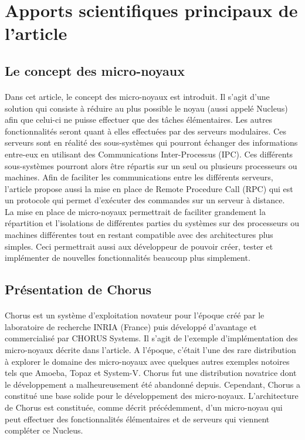 \documentclass[a4paper, 12pt]{article}
\begin{document}
\clearpage 
\section{Apports scientifiques principaux de l’article}
\subsection{Le concept des micro-noyaux}
\paragraph{}

Dans cet article, le concept des micro-noyaux est introduit. Il s'agit d'une solution qui consiste à réduire au plus possible le noyau (aussi appelé Nucleus) afin que celui-ci ne puisse effectuer que des tâches élémentaires. Les autres fonctionnalités seront quant à elles effectuées par des serveurs modulaires. Ces serveurs sont en réalité des sous-systèmes qui pourront échanger des informations entre-eux en utilisant des Communications Inter-Processus (IPC). Ces différents sous-systèmes pourront alors être répartis sur un seul ou plusieurs processeurs ou machines. Afin de faciliter les communications entre les différents serveurs, l'article propose aussi la mise en place de Remote Procedure Call (RPC) qui est un protocole qui permet d'exécuter des commandes sur un serveur à distance. \\
La mise en place de micro-noyaux permettrait de faciliter grandement la répartition et l'isolations de différentes parties du systèmes sur des processeurs ou machines différentes tout en restant compatible avec des architectures plus simples. Ceci permettrait aussi aux développeur de pouvoir créer, tester et implémenter de nouvelles fonctionnalités beaucoup plus simplement.

\subsection{Présentation de Chorus}
\paragraph{}
Chorus est un système d'exploitation novateur pour l'époque créé par le laboratoire de recherche INRIA (France) puis développé d'avantage et commercialisé par CHORUS Systems. Il s'agit de l'exemple d'implémentation des micro-noyaux décrite dans l'article. A l'époque, c'était l'une des rare distribution à explorer le domaine des micro-noyaux avec quelques autres exemples notoires tels que Amoeba, Topaz et System-V. Chorus fut une distribution novatrice dont le développement a malheureusement été abandonné depuis. Cependant, Chorus a constitué une base solide pour le développement des micro-noyaux. L'architecture de Chorus est constituée, comme décrit précédemment, d'un micro-noyau qui peut effectuer des fonctionnalités élémentaires et de serveurs qui viennent compléter ce Nucleus.
\\
\end{document}
